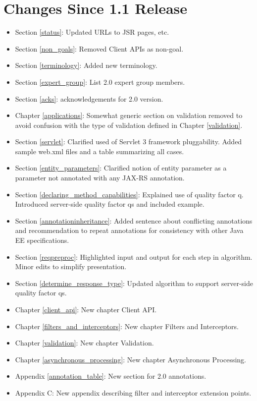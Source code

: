 \section{Changes Since 1.1 Release}

\begin{itemize}
\item Section \ref{status}: Updated URLs to JSR pages, etc.
\item Section \ref{non_goals}: Removed Client APIs as non-goal.
\item Section \ref{terminology}: Added new terminology.
\item Section \ref{expert_group}: List 2.0 expert group members.
\item Section \ref{acks}: acknowledgements for 2.0 version.
\item Chapter \ref{applications}: Somewhat generic section on validation removed to avoid confusion with the type of validation defined in Chapter \ref{validation}.
\item Section \ref{servlet}: Clarified used of Servlet 3 framework pluggability. Added sample web.xml files and a table summarizing all cases.
\item Section \ref{entity_parameters}: Clarified notion of entity parameter as a parameter not annotated with any JAX-RS annotation.
\item Section \ref{declaring_method_capabilities}: Explained use of quality factor q. Introduced server-side quality factor qs and included example.
\item Section \ref{annotationinheritance}: Added sentence about conflicting annotations and recommendation to repeat annotations for consistency with other Java EE specifications.
\item Section \ref{reqpreproc}: Highlighted input and output for each step in algorithm. Minor edits to simplify presentation.
\item Section \ref{determine_response_type}: Updated algorithm to support server-side quality factor qs.
\item Chapter \ref{client_api}: New chapter Client API.
\item Chapter \ref{filters_and_interceptors}: New chapter Filters and Interceptors.
\item Chapter \ref{validation}: New chapter Validation.
\item Chapter \ref{asynchronous_processing}: New chapter Asynchronous Processing.
\item Appendix \ref{annotation_table}: New section for 2.0 annotations.
\item Appendix C: New appendix describing filter and interceptor extension points.
\end{itemize}

